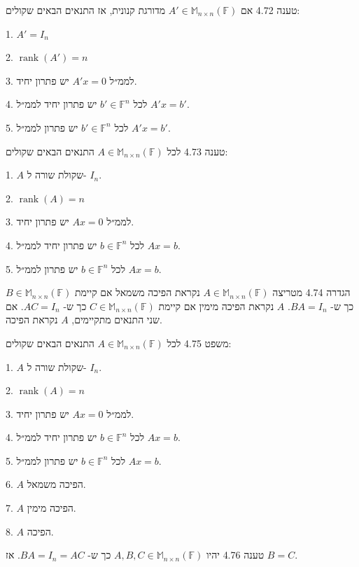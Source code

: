 \documentclass[a4paper, 11pt]{article}
\begin{document}
\begin{envbox}[thmcolor]{טענה 4.72}
אם $A'\in\mathbb{M}_{n\times n}(\mathbb{F})$ מדורגת קנונית, אז התנאים הבאים שקולים:

1.  $A'=I_n$

2.  $\mathop{\mathrm{rank}}(A')=n$

3.  לממ״ל $A'x=0$ יש פתרון יחיד.

4.  לכל $b'\in\mathbb{F}^n$ יש פתרון יחיד לממ״ל $A'x=b'$.

5.  לכל $b'\in\mathbb{F}^n$ יש פתרון לממ״ל $A'x=b'$.
\end{envbox}

\begin{envbox}[thmcolor]{טענה 4.73}
לכל $A\in\mathbb{M}_{n\times n}(\mathbb{F})$ התנאים הבאים שקולים:

1.  $A$ שקולת שורה ל- $I_n$.

2.  $\mathop{\mathrm{rank}}(A)=n$

3.  לממ״ל $Ax=0$ יש פתרון יחיד.

4.  לכל $b\in\mathbb{F}^n$ יש פתרון יחיד לממ״ל $Ax=b$.

5.  לכל $b\in\mathbb{F}^n$ יש פתרון לממ״ל $Ax=b$.
\end{envbox}

\begin{envbox}[defcolor]{הגדרה 4.74}
מטריצה $A\in\mathbb{M}_{n\times n}(\mathbb{F})$ נקראת הפיכה משמאל אם קיימת $B\in\mathbb{M}_{n\times n}(\mathbb{F})$ כך ש- $BA=I_n$. $A$ נקראת הפיכה מימין אם קיימת $C\in\mathbb{M}_{n\times n}(\mathbb{F})$ כך ש- $AC=I_n$. אם שני התנאים מתקיימים, $A$ נקראת הפיכה.
\end{envbox}

\begin{envbox}[thmcolor]{משפט 4.75}
לכל $A\in\mathbb{M}_{n\times n}(\mathbb{F})$ התנאים הבאים שקולים:

1.  $A$ שקולת שורה ל- $I_n$.

2.  $\mathop{\mathrm{rank}}(A)=n$

3.  לממ״ל $Ax=0$ יש פתרון יחיד.

4.  לכל $b\in\mathbb{F}^n$ יש פתרון יחיד לממ״ל $Ax=b$.

5.  לכל $b\in\mathbb{F}^n$ יש פתרון לממ״ל $Ax=b$.

6.  $A$ הפיכה משמאל.

7.  $A$ הפיכה מימין.

8.  $A$ הפיכה.
\end{envbox}

\begin{envbox}[thmcolor]{טענה 4.76}
יהיו $A,B,C\in\mathbb{M}_{n\times n}(\mathbb{F})$ כך ש- $BA=I_n=AC$. אז $B=C$.
\end{envbox}
\end{document}
